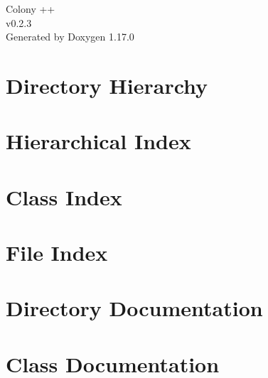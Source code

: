 \documentclass[twoside]{book}
\newcommand{\+}{\discretionary{\mbox{\scriptsize$\hookleftarrow$}}{}{}}
\newcommand{\clearemptydoublepage}{%
    \newpage{\pagestyle{empty}\cleardoublepage}%
  }
\begin{document}
  \raggedbottom
    \hypersetup{pageanchor=false,
                bookmarksnumbered=true,
                pdfencoding=unicode
               }
  \begin{titlepage}
  \vspace*{7cm}
  \begin{center}%
  {\Large Colony ++}\\
  [1ex]\large v0.\+2.\+3 \\
  \vspace*{1cm}
  {\large Generated by Doxygen 1.17.0}\\
  \end{center}
  \end{titlepage}
  \clearemptydoublepage
  \tableofcontents
  \clearemptydoublepage
  \hypersetup{pageanchor=true}

\chapter{Directory Hierarchy}

\chapter{Hierarchical Index}

\chapter{Class Index}

\chapter{File Index}

\chapter{Directory Documentation}

\chapter{Class Documentation}

















\end{document}
